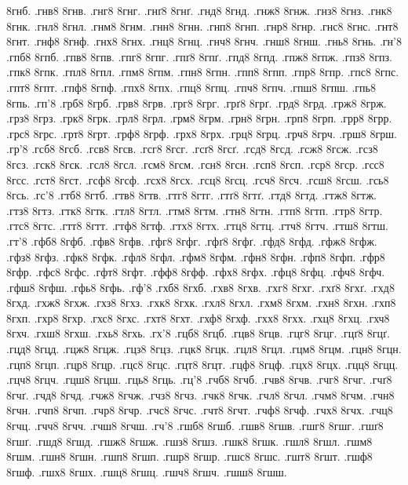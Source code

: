 {8гнб.
.гнв8
8гнв.
.гнг8
8гнг.
.гнґ8
8гнґ.
.гнд8
8гнд.
.гнж8
8гнж.
.гнз8
8гнз.
.гнк8
8гнк.
.гнл8
8гнл.
.гнм8
8гнм.
.гнн8
8гнн.
.гнп8
8гнп.
.гнр8
8гнр.
.гнс8
8гнс.
.гнт8
8гнт.
.гнф8
8гнф.
.гнх8
8гнх.
.гнц8
8гнц.
.гнч8
8гнч.
.гнш8
8гнш.
.гнь8
8гнь.
.гн'8
.гпб8
8гпб.
.гпв8
8гпв.
.гпг8
8гпг.
.гпґ8
8гпґ.
.гпд8
8гпд.
.гпж8
8гпж.
.гпз8
8гпз.
.гпк8
8гпк.
.гпл8
8гпл.
.гпм8
8гпм.
.гпн8
8гпн.
.гпп8
8гпп.
.гпр8
8гпр.
.гпс8
8гпс.
.гпт8
8гпт.
.гпф8
8гпф.
.гпх8
8гпх.
.гпц8
8гпц.
.гпч8
8гпч.
.гпш8
8гпш.
.гпь8
8гпь.
.гп'8
.грб8
8грб.
.грв8
8грв.
.грг8
8грг.
.грґ8
8грґ.
.грд8
8грд.
.грж8
8грж.
.грз8
8грз.
.грк8
8грк.
.грл8
8грл.
.грм8
8грм.
.грн8
8грн.
.грп8
8грп.
.грр8
8грр.
.грс8
8грс.
.грт8
8грт.
.грф8
8грф.
.грх8
8грх.
.грц8
8грц.
.грч8
8грч.
.грш8
8грш.
.гр'8
.гсб8
8гсб.
.гсв8
8гсв.
.гсг8
8гсг.
.гсґ8
8гсґ.
.гсд8
8гсд.
.гсж8
8гсж.
.гсз8
8гсз.
.гск8
8гск.
.гсл8
8гсл.
.гсм8
8гсм.
.гсн8
8гсн.
.гсп8
8гсп.
.гср8
8гср.
.гсс8
8гсс.
.гст8
8гст.
.гсф8
8гсф.
.гсх8
8гсх.
.гсц8
8гсц.
.гсч8
8гсч.
.гсш8
8гсш.
.гсь8
8гсь.
.гс'8
.гтб8
8гтб.
.гтв8
8гтв.
.гтг8
8гтг.
.гтґ8
8гтґ.
.гтд8
8гтд.
.гтж8
8гтж.
.гтз8
8гтз.
.гтк8
8гтк.
.гтл8
8гтл.
.гтм8
8гтм.
.гтн8
8гтн.
.гтп8
8гтп.
.гтр8
8гтр.
.гтс8
8гтс.
.гтт8
8гтт.
.гтф8
8гтф.
.гтх8
8гтх.
.гтц8
8гтц.
.гтч8
8гтч.
.гтш8
8гтш.
.гт'8
.гфб8
8гфб.
.гфв8
8гфв.
.гфг8
8гфг.
.гфґ8
8гфґ.
.гфд8
8гфд.
.гфж8
8гфж.
.гфз8
8гфз.
.гфк8
8гфк.
.гфл8
8гфл.
.гфм8
8гфм.
.гфн8
8гфн.
.гфп8
8гфп.
.гфр8
8гфр.
.гфс8
8гфс.
.гфт8
8гфт.
.гфф8
8гфф.
.гфх8
8гфх.
.гфц8
8гфц.
.гфч8
8гфч.
.гфш8
8гфш.
.гфь8
8гфь.
.гф'8
.гхб8
8гхб.
.гхв8
8гхв.
.гхг8
8гхг.
.гхґ8
8гхґ.
.гхд8
8гхд.
.гхж8
8гхж.
.гхз8
8гхз.
.гхк8
8гхк.
.гхл8
8гхл.
.гхм8
8гхм.
.гхн8
8гхн.
.гхп8
8гхп.
.гхр8
8гхр.
.гхс8
8гхс.
.гхт8
8гхт.
.гхф8
8гхф.
.гхх8
8гхх.
.гхц8
8гхц.
.гхч8
8гхч.
.гхш8
8гхш.
.гхь8
8гхь.
.гх'8
.гцб8
8гцб.
.гцв8
8гцв.
.гцг8
8гцг.
.гцґ8
8гцґ.
.гцд8
8гцд.
.гцж8
8гцж.
.гцз8
8гцз.
.гцк8
8гцк.
.гцл8
8гцл.
.гцм8
8гцм.
.гцн8
8гцн.
.гцп8
8гцп.
.гцр8
8гцр.
.гцс8
8гцс.
.гцт8
8гцт.
.гцф8
8гцф.
.гцх8
8гцх.
.гцц8
8гцц.
.гцч8
8гцч.
.гцш8
8гцш.
.гць8
8гць.
.гц'8
.гчб8
8гчб.
.гчв8
8гчв.
.гчг8
8гчг.
.гчґ8
8гчґ.
.гчд8
8гчд.
.гчж8
8гчж.
.гчз8
8гчз.
.гчк8
8гчк.
.гчл8
8гчл.
.гчм8
8гчм.
.гчн8
8гчн.
.гчп8
8гчп.
.гчр8
8гчр.
.гчс8
8гчс.
.гчт8
8гчт.
.гчф8
8гчф.
.гчх8
8гчх.
.гчц8
8гчц.
.гчч8
8гчч.
.гчш8
8гчш.
.гч'8
.гшб8
8гшб.
.гшв8
8гшв.
.гшг8
8гшг.
.гшґ8
8гшґ.
.гшд8
8гшд.
.гшж8
8гшж.
.гшз8
8гшз.
.гшк8
8гшк.
.гшл8
8гшл.
.гшм8
8гшм.
.гшн8
8гшн.
.гшп8
8гшп.
.гшр8
8гшр.
.гшс8
8гшс.
.гшт8
8гшт.
.гшф8
8гшф.
.гшх8
8гшх.
.гшц8
8гшц.
.гшч8
8гшч.
.гшш8
8гшш.
}
